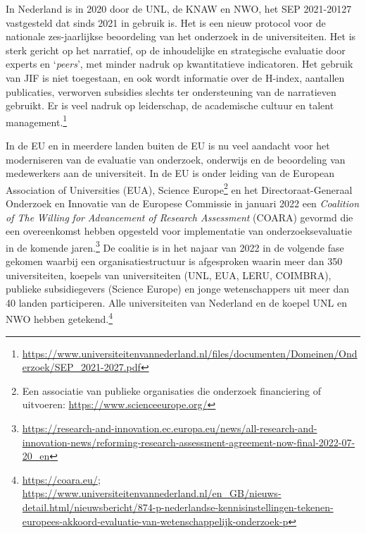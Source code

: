 \documentclass[smallauthor, chapterhaspagenum, nochapterinheader, pagenuminheader,  bigchapnum,medium2, tocpages, garamond, titleinheader]{jote-book}
\begin{document}
	In Nederland is in 2020 door de UNL, de KNAW en NWO, het SEP 2021-20127 vastgesteld dat sinds 2021 in gebruik is. Het is een nieuw protocol voor de nationale zes-jaarlijkse beoordeling van het onderzoek in de universiteiten. Het is sterk gericht op het narratief, op de inhoudelijke en strategische evaluatie door experts en ‘\emph{peers}', met minder nadruk op kwantitatieve indicatoren. Het gebruik van JIF is niet toegestaan, en ook wordt informatie over de H-index, aantallen publicaties, verworven subsidies slechts ter ondersteuning van de narratieven gebruikt. Er is veel nadruk op leiderschap, de academische cultuur en talent management.\footnote{\href{https://www.universiteitenvannederland.nl/files/documenten/Domeinen/Onderzoek/SEP_2021-2027.pdf}{https://www.universiteitenvannederland.nl/files/documenten/Domeinen/Onderzoek/SEP\_2021-2027.pdf} }



	In de EU en in meerdere landen buiten de EU is nu veel aandacht voor het moderniseren van de evaluatie van onderzoek, onderwijs en de beoordeling van medewerkers aan de universiteit. In de EU is onder leiding van de European Association of Universities (EUA), Science Europe\footnote{Een associatie van publieke organisaties die onderzoek financiering of uitvoeren: \href{https://www.scienceeurope.org/}{https://www.scienceeurope.org/} } en het Directoraat-Generaal Onderzoek en Innovatie van de Europese Commissie in januari 2022 een \emph{Coalition}\emph{ of The }\emph{Willing}\emph{ }\emph{for}\emph{ }\emph{Advancement}\emph{ of Research Assessment}\emph{ }(COARA) gevormd die een overeenkomst hebben opgesteld voor implementatie van onderzoeksevaluatie in de komende jaren.\footnote{\href{https://research-and-innovation.ec.europa.eu/news/all-research-and-innovation-news/reforming-research-assessment-agreement-now-final-2022-07-20_en}{https://research-and-innovation.ec.europa.eu/news/all-research-and-innovation-news/reforming-research-assessment-agreement-now-final-2022-07-20\_en} } De coalitie is in het najaar van 2022 in de volgende fase gekomen waarbij een organisatiestructuur is afgesproken waarin meer dan 350 universiteiten, koepels van universiteiten (UNL, EUA, LERU, COIMBRA), publieke subsidiegevers (Science Europe) en jonge wetenschappers uit meer dan 40 landen participeren. Alle universiteiten van Nederland en de koepel UNL en NWO hebben getekend.\footnote{\href{https://coara.eu/}{https://coara.eu/}; \href{https://www.universiteitenvannederland.nl/en_GB/nieuws-detail.html/nieuwsbericht/874-p-nederlandse-kennisinstellingen-tekenen-europees-akkoord-evaluatie-van-wetenschappelijk-onderzoek-p}{https://www.universiteitenvannederland.nl/en\_GB/nieuws-detail.html/nieuwsbericht/874-p-nederlandse-kennisinstellingen-tekenen-europees-akkoord-evaluatie-van-wetenschappelijk-onderzoek-p} }
\end{document}
